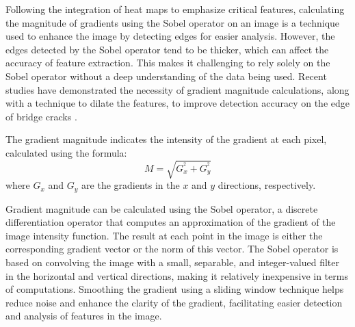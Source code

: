 \documentclass{ieeeaccess}
\begin{document}
Following the integration of heat maps to emphasize critical features, calculating the magnitude of gradients using the Sobel operator on an image is a technique used to enhance the image by detecting edges for easier analysis.
However, the edges detected by the Sobel operator tend to be thicker, which can affect the accuracy of feature extraction. This makes it challenging to rely solely on the Sobel operator without a deep understanding of the data being used.
Recent studies have demonstrated the necessity of gradient magnitude calculations, along with a technique to dilate the features, to improve detection accuracy on the edge of bridge cracks \cite{wang2019research}. 

The gradient magnitude indicates the intensity of the gradient at each pixel, calculated using the formula:
\begin{equation}
\label{eq:magnitude}
M=\sqrt{G_x^{^2}+G_y^{^2}}
\end{equation}
where $G_x$ and $G_y$ are the gradients in the $x$ and $y$ directions, respectively.

Gradient magnitude can be calculated using the Sobel operator, a discrete differentiation operator that computes an approximation of the gradient of the image intensity function. The result at each point in the image is either the corresponding gradient vector or the norm of this vector. The Sobel operator is based on convolving the image with a small, separable, and integer-valued filter in the horizontal and vertical directions, making it relatively inexpensive in terms of computations. Smoothing the gradient using a sliding window technique helps reduce noise and enhance the clarity of the gradient, facilitating easier detection and analysis of features in the image.
\end{document}
